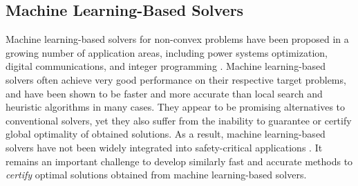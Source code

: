 \documentclass[10pt]{article} %
\theoremstyle{plain}
\theoremstyle{definition}
\theoremstyle{remark}
\begin{document}

\subsection*{Machine Learning-Based Solvers}

Machine learning-based solvers for non-convex problems have been proposed in a growing number of application areas, including power systems optimization, digital communications, and integer programming \citep{van2021machine, samuel2017deep, bertsimas2022online}. Machine learning-based solvers often achieve very good performance on their respective target problems, and have been shown to be faster and more accurate than local search and heuristic algorithms in many cases. They appear to be promising alternatives to conventional solvers, yet they also suffer from the inability to guarantee or certify global optimality of obtained solutions. As a result, machine learning-based solvers have not been widely integrated into safety-critical applications \citep{sun2023online}. It remains an important challenge to develop similarly fast and accurate methods to \textit{certify} optimal solutions obtained from machine learning-based solvers.
\end{document}
